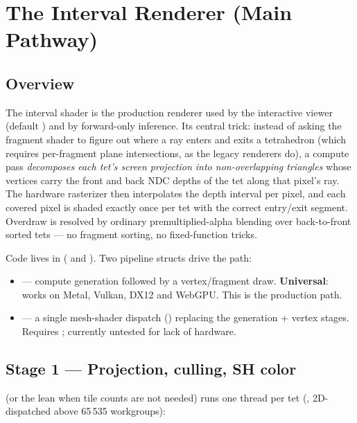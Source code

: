 \chapter{The Interval Renderer (Main Pathway)}\label{ch:interval-renderer}

\section{Overview}

The interval shader is the production renderer used by the interactive viewer
(default ) and by forward-only inference.
Its central trick: instead of asking the fragment shader to figure out where
a ray enters and exits a tetrahedron (which requires per-fragment plane
intersections, as the legacy renderers do), a compute pass \emph{decomposes
each tet's screen projection into non-overlapping triangles} whose vertices
carry the front and back NDC depths of the tet along that pixel's ray. The
hardware rasterizer then interpolates the depth interval per pixel, and each
covered pixel is shaded exactly once per tet with the correct entry/exit
segment. Overdraw is resolved by ordinary premultiplied-alpha blending over
back-to-front sorted tets --- no fragment sorting, no fixed-function tricks.

Code lives in  ( and
). Two pipeline structs drive the path:

\begin{itemize}
\item {} --- compute generation followed by a
  vertex/fragment draw. \textbf{Universal}: works on Metal, Vulkan, DX12 and
  WebGPU. This is the production path.
\item {} --- a single mesh-shader dispatch
  () replacing the generation + vertex stages.
  Requires ; currently untested for
  lack of hardware.
\end{itemize}

\section{Stage 1 --- Projection, culling, SH color}

 (or the lean  when
tile counts are not needed) runs one thread per tet
(, 2D-dispatched above 65\,535 workgroups):

